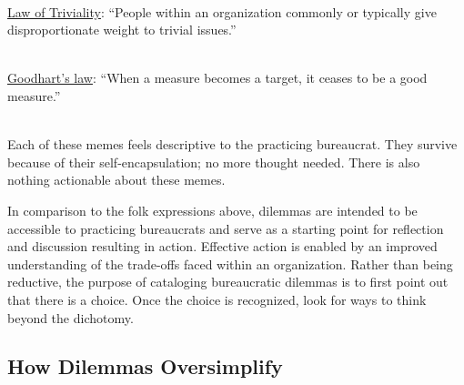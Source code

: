 \ \\
\href{https://en.wikipedia.org/wiki/Law_of_triviality}{Law of Triviality}:%
%
%
``People within an organization commonly or typically give disproportionate weight to trivial issues.''

\ \\
\href{https://en.wikipedia.org/wiki/Goodhart\%27s_law}{Goodhart's law}:
%
%
%
``When a measure becomes a target, it ceases to be a good measure.''

\ \\

Each of these memes feels descriptive to the practicing bureaucrat. They survive because of their self-encapsulation; no more thought needed. There is also nothing actionable about these memes.

In comparison to the folk expressions above, dilemmas are intended to be accessible to practicing bureaucrats and serve as a starting point for reflection and discussion resulting in action. Effective action is enabled by an improved understanding of the trade-offs faced within an organization. Rather than being reductive, the purpose of cataloging bureaucratic dilemmas is to first point out that there is a choice. Once the choice is recognized, look for ways to think beyond the dichotomy.

\subsection*{How Dilemmas Oversimplify}

